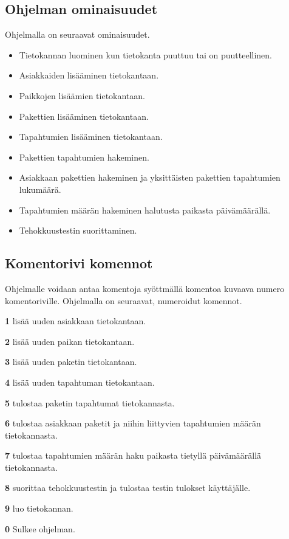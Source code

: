 \documentclass[11pt,a4paper]{article}
\begin{document}
\subsection{Ohjelman ominaisuudet}
Ohjelmalla on seuraavat ominaisuudet.
\begin{itemize}
\item Tietokannan luominen kun tietokanta puuttuu tai on puutteellinen.
\item Asiakkaiden lisääminen tietokantaan.
\item Paikkojen lisäämien tietokantaan.
\item Pakettien lisääminen tietokantaan.
\item Tapahtumien lisääminen tietokantaan.
\item Pakettien tapahtumien hakeminen.
\item Asiakkaan pakettien hakeminen ja yksittäisten pakettien tapahtumien lukumäärä.
\item Tapahtumien määrän hakeminen halutusta paikasta päivämäärällä.
\item Tehokkuustestin suorittaminen.
\end{itemize}
\newpage
\subsection{Komentorivi komennot}
Ohjelmalle voidaan antaa komentoja syöttmällä komentoa kuvaava numero komentoriville. Ohjelmalla on seuraavat, numeroidut komennot.
\begin{description}
\item \textbf{1} lisää uuden asiakkaan tietokantaan.
\item \textbf{2} lisää uuden paikan tietokantaan.
\item \textbf{3} lisää uuden paketin tietokantaan.
\item \textbf{4} lisää uuden tapahtuman tietokantaan.
\item \textbf{5} tulostaa paketin tapahtumat tietokannasta.
\item \textbf{6} tulostaa asiakkaan paketit ja niihin liittyvien tapahtumien määrän tietokannasta.
\item \textbf{7} tulostaa tapahtumien määrän haku paikasta tietyllä päivämäärällä tietokannasta.
\item \textbf{8} suorittaa tehokkuustestin ja tulostaa testin tulokset käyttäjälle.
\item \textbf{9} luo tietokannan.
\item \textbf{0} Sulkee ohjelman.
\end{description}
\end{document}
